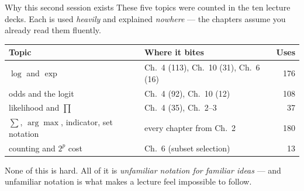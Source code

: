 \documentclass[aspectratio=169,11pt]{beamer}
\begin{document}
\begin{frame}{Why this second session exists}
  \footnotesize
  These five topics were counted in the ten lecture decks. Each is used
  \emph{heavily} and explained \emph{nowhere} --- the chapters assume you
  already read them fluently.
  \begin{center}
  \begin{tabular}{@{}llr@{}}
    \toprule
    \textbf{Topic} & \textbf{Where it bites} & \textbf{Uses} \\
    \midrule
    $\log$ and $\exp$ & Ch.\ 4 (113), Ch.\ 10 (31), Ch.\ 6 (16) & 176 \\
    odds and the logit & Ch.\ 4 (92), Ch.\ 10 (12) & 108 \\
    likelihood and $\prod$ & Ch.\ 4 (35), Ch.\ 2--3 & 37 \\
    $\sum$, $\arg\max$, indicator, set notation & every chapter from Ch.\ 2 & 180 \\
    counting and $2^p$ cost & Ch.\ 6 (subset selection) & 13 \\
    \bottomrule
  \end{tabular}
  \end{center}
  \begin{takeaway}
    None of this is hard. All of it is \emph{unfamiliar notation for familiar
    ideas} --- and unfamiliar notation is what makes a lecture feel
    impossible to follow.
  \end{takeaway}
\end{frame}
\end{document}
